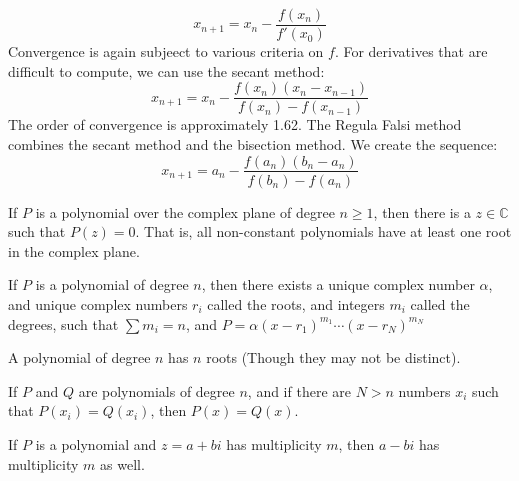         \begin{equation*}
            x_{n+1}=x_{n}-\frac{f(x_{n})}{f'(x_{0})}
        \end{equation*}
        Convergence is again subjeect to various criteria
        on $f$. For derivatives that are difficult to
        compute, we can use the secant method:
        \begin{equation*}
            x_{n+1}=x_{n}-\frac{f(x_{n})(x_{n}-x_{n-1})}
                               {f(x_{n})-f(x_{n-1})}
        \end{equation*}
        The order of convergence is approximately 1.62.
        The Regula Falsi method combines the secant
        method and the bisection method. We create the
        sequence:
        \begin{equation*}
            x_{n+1}=a_{n}-\frac{f(a_{n})(b_{n}-a_{n})}
                               {f(b_{n})-f(a_{n})}
        \end{equation*}
        \begin{theorem}
            If $P$ is a polynomial over the complex plane
            of degree $n\geq{1}$,
            then there is a $z\in\mathbb{C}$
            such that $P(z)=0$. That is,
            all non-constant polynomials have at least
            one root in the complex plane.
        \end{theorem}
        \begin{theorem}
            If $P$ is a polynomial of degree $n$,
            then there exists a unique complex number $\alpha$,
            and unique complex numbers $r_{i}$ called the roots,
            and integers $m_{i}$ called the degrees,
            such that $\sum{m_{i}}=n$, and
            $P=\alpha(x-r_{1})^{m_{1}}\cdots(x-r_{N})^{m_{N}}$
        \end{theorem}
        \begin{theorem}
            A polynomial of degree $n$ has
            $n$ roots (Though they may not be distinct).
        \end{theorem}
        \begin{theorem}
            If $P$ and $Q$ are polynomials
            of degree $n$, and if there are
            $N>n$ numbers $x_{i}$ such that
            $P(x_{i})=Q(x_{i})$, then
            $P(x)=Q(x)$.
        \end{theorem}
        \begin{theorem}
            If $P$ is a polynomial and
            $z=a+bi$ has multiplicity $m$, then
            $a-bi$ has multiplicity $m$ as well.
        \end{theorem}
